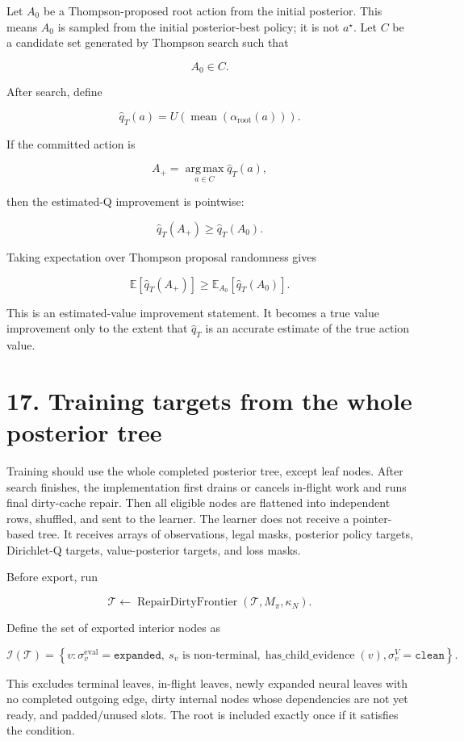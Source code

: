\documentclass[11pt]{article}
\newcommand{\E}{\mathbb{E}}
\newcommand{\argmax}{\operatorname*{arg\,max}}
\newcommand{\mean}{\operatorname{mean}}
\newcommand{\Tree}{\mathcal{T}}
\newcommand{\Interior}{\mathcal{I}}
\newcommand{\Utility}{U}
\newcommand{\RepairDirtyFrontier}{\operatorname{RepairDirtyFrontier}}
\begin{document}
Let \(A_0\) be a Thompson-proposed root action from the initial posterior. This
means \(A_0\) is sampled from the initial posterior-best policy; it is not
\(a^\star\). Let \(C\) be a candidate set generated by Thompson search such that

\[
A_0 \in C.
\]

After search, define

\[
\hat{q}_T(a)
=
\Utility
\left(
\mean
\left(
\alpha_{\mathrm{root}}(a)
\right)
\right).
\]

If the committed action is

\[
A_+
=
\argmax_{a\in C}
\hat{q}_T(a),
\]

then the estimated-Q improvement is pointwise:

\[
\hat{q}_T(A_+)
\ge
\hat{q}_T(A_0).
\]

Taking expectation over Thompson proposal randomness gives

\[
\E
\left[
\hat{q}_T(A_+)
\right]
\ge
\E_{A_0}
\left[
\hat{q}_T(A_0)
\right].
\]

This is an estimated-value improvement statement. It becomes a true value
improvement only to the extent that \(\hat{q}_T\) is an accurate estimate of the
true action value.


\section*{17. Training targets from the whole posterior tree}

Training should use the whole completed posterior tree, except leaf nodes. After
search finishes, the implementation first drains or cancels in-flight work and
runs final dirty-cache repair. Then all eligible nodes are flattened into
independent rows, shuffled, and sent to the learner. The learner does not
receive a pointer-based tree. It receives arrays of observations, legal masks,
posterior policy targets, Dirichlet-Q targets, value-posterior targets, and loss
masks.

Before export, run

\[
\Tree\gets\RepairDirtyFrontier(\Tree,M_\pi,\kappa_N).
\]

Define the set of exported interior nodes as

\[
\Interior(\Tree)
=
\left\{
 v:
 \sigma^{\mathrm{eval}}_v=\texttt{expanded},
 \ s_v\text{ is non-terminal},
 \operatorname{has\_child\_evidence}(v),
 \sigma^V_v=\texttt{clean}
\right\}.
\]

This excludes terminal leaves, in-flight leaves, newly expanded neural leaves
with no completed outgoing edge, dirty internal nodes whose dependencies are not
yet ready, and padded/unused slots. The root is included exactly once if it
satisfies the condition.
\end{document}
